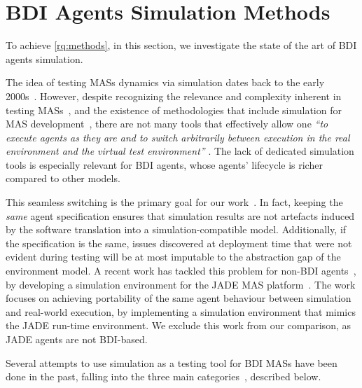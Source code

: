 \section{\ac{BDI} Agents Simulation Methods}
\label{sec:simulation:related-works}

To achieve \ref{rq:methods},
in this section,
we investigate the state of the art of \ac{BDI} agents simulation.

The idea of testing \acp{MAS} dynamics via simulation
dates back to the early 2000s~\cite{uhrmacher_simulation_2002}.
%
However,
despite recognizing the relevance and complexity inherent in testing \acp{MAS}~\cite{miles_why_2010,nguyen_testing_2011},
and the existence of methodologies that include simulation for \ac{MAS} development~\cite{cossentino_passim_2008},
there are not many tools that effectively allow one
\emph{
    ``to execute agents as they are and to switch arbitrarily between execution in the real environment and the virtual test environment''
}\cite{uhrmacher_simulation_2002}.
%
The lack of dedicated simulation tools
is especially relevant for \ac{BDI} agents,
whose agents' lifecycle is richer compared to other models.

This seamless switching is the primary goal for our work~\cite{DBLP:conf/dsrt/Baiardi24}.
%
In fact,
keeping the \emph{same} agent specification
ensures that simulation results are not artefacts induced
by the software translation into a simulation-compatible model.
%
Additionally,
if the specification is the same,
issues discovered at deployment time that were not evident during testing
will be at most imputable to the abstraction gap of the environment model.
%
A recent work has tackled this problem for non-\ac{BDI} agents~\cite{Briola2025},
by developing a simulation environment for the JADE \ac{MAS} platform~\cite{DBLP:books/wi/BellifemineCG07}.
%
The work focuses on achieving portability of the same agent behaviour between simulation and real-world execution,
by implementing a simulation environment that mimics the JADE run-time environment.
%
We exclude this work from our comparison, as JADE agents are not \ac{BDI}-based.

%
Several attempts to use simulation as a testing tool for \ac{BDI} \acp{MAS} have been done in the past,
falling into the three main categories~\cite{singh_integrating_2016},
described below.

